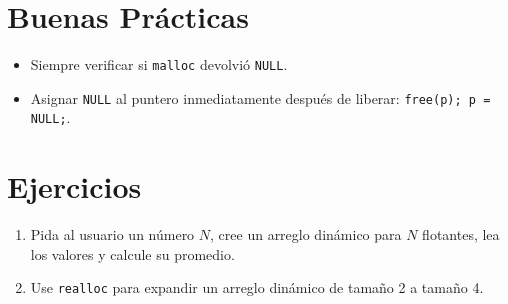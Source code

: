 \documentclass[12pt,a4paper]{article}
\begin{document}
\section{Buenas Prácticas}
\begin{itemize}
    \item Siempre verificar si \texttt{malloc} devolvió \texttt{NULL}.
    \item Asignar \texttt{NULL} al puntero inmediatamente después de liberar: \texttt{free(p); p = NULL;}.
\end{itemize}

\section{Ejercicios}
\begin{enumerate}
    \item Pida al usuario un número $N$, cree un arreglo dinámico para $N$ flotantes, lea los valores y calcule su promedio.
    \item Use \texttt{realloc} para expandir un arreglo dinámico de tamaño 2 a tamaño 4.
\end{enumerate}
\end{document}
